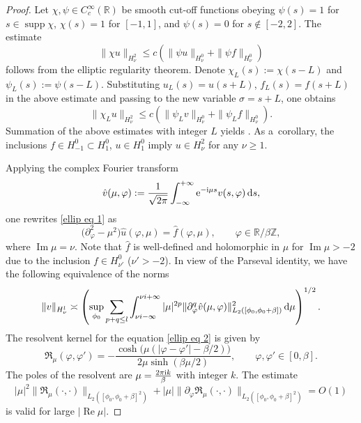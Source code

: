 \documentclass[pdftex]{sigma}
\numberwithin{equation}{section}
\theoremstyle{definition}
\begin{document}
\begin{proof}
Let $\chi,\psi\in C_c^\infty(\mathbb{R})$ be smooth cut-off functions obeying $\psi(s)=1$ for~${s\in \operatorname{supp}\chi}$, $\chi(s)=1$ for $[-1,1]$, and $\psi(s)=0$ for $s\not\in[-2,2]$. The estimate
\[\|\chi u\|_{H_\nu^2}\le c(\|\psi u\|_{H_\nu^0}+\|\psi f\|_{H_\nu^0})\]
follows from the elliptic regularity theorem. Denote $\chi_L(s):=\chi(s-L)$ and $\psi_L(s):=\psi(s-L)$. Substituting $u_L(s)=u(s+L)$, $f_L(s)=f(s+L)$ in the above estimate and passing to the new variable $\sigma=s+L$, one obtains
\[\|\chi_L u\|_{H_\nu^2}\le c(\|\psi_L v\|_{H_\nu^0}+\|\psi_L f\|_{H_\nu^0}).\]
Summation of the above estimates with integer $L$ yields
.
As a~corollary, the inclusions $f\in H^0_{-1}\subset H^0_1$, $u\in H^0_1$ imply $u\in H^2_\nu$ for any $\nu\ge 1$.

Applying the complex Fourier transform
\[\hat{v}(\mu,\varphi):=\frac{1}{\sqrt{2\pi}}\int_{-\infty}^{+\infty}{\rm e}^{-{\rm i}\mu s}v(s,\varphi)\,{\rm d}s,\]
one rewrites \eqref{ellip eq 1} as
\begin{equation}
\label{ellip eq 2}
\bigl(\partial_\varphi^2-\mu^2\bigr)\hat{u}(\varphi,\mu)=\hat{f}(\varphi,\mu), \qquad \varphi\in\mathbb{R}/\beta\mathbb{Z},
\end{equation}
where $\operatorname{Im}\mu=\nu$. Note that $\hat{f}$ is well-defined and holomorphic in $\mu$ for $\operatorname{Im}\mu>-2$ due to the inclusion $f\in H^0_{\nu'}$ ($\nu'>-2$). In view of the Parseval identity, we have the following equivalence of the norms
\[%
\|v\|_{H_\nu^l}\asymp\left(\sup_{\phi_0}\sum_{p+q\le l}\int_{\nu i-\infty}^{\nu i+\infty}|\mu|^{2p}\|\partial^q_\varphi\hat{v}(\mu,\varphi)\|_{L_2([\phi_0,\phi_0+\beta])}^2 \,{\rm d}\mu\right)^{1/2}.
\]
The resolvent kernel for the equation \eqref{ellip eq 2} is given by
\[\mathfrak{R}_\mu(\varphi,\varphi')=-\frac{\cosh \bigl(\mu(|\varphi-\varphi'|-\beta/2)\bigr)}{2\mu \sinh(\beta\mu/2)}, \qquad \varphi,\varphi'\in [0,\beta].\]
The poles of the resolvent are $\mu=\frac{2\pi {\rm i} k}{\beta}$ with integer $k$. The estimate
\begin{equation}
\label{RK estimatesat infinity}
|\mu|^2\|\mathfrak{R}_\mu(\cdot,\cdot)\|_{L_2([\phi_0,\phi_0+\beta]^2)}+|\mu|\|\partial_\varphi\mathfrak{R}_\mu(\cdot,\cdot)\|_{L_2([\phi_0,\phi_0+\beta]^2)}=O(1)
\end{equation}
is valid for large $|\operatorname{Re}\mu|$.


\end{proof}
\end{document}
